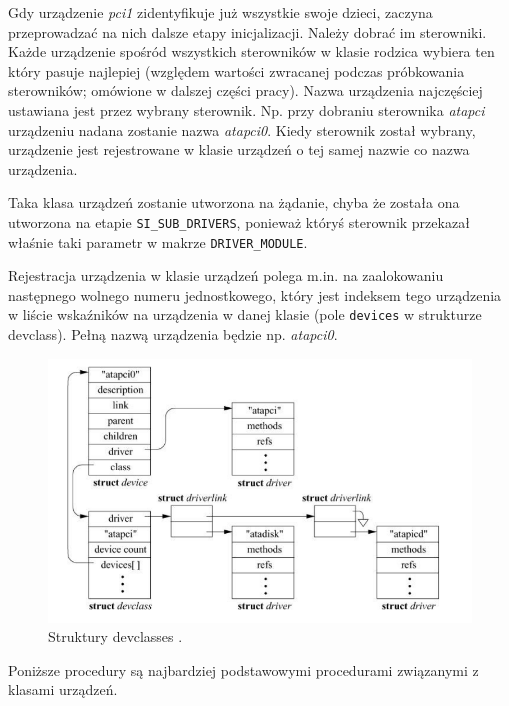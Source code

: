 \documentclass[shortabstract,inz]{iithesis}
\begin{document}
Gdy urządzenie \textit{pci1} zidentyfikuje już wszystkie swoje dzieci, zaczyna przeprowadzać 
na nich dalsze etapy inicjalizacji.
Należy dobrać im sterowniki. Każde urządzenie spośród wszystkich sterowników w
klasie rodzica wybiera ten który pasuje najlepiej (względem wartości zwracanej podczas 
próbkowania sterowników; omówione w dalszej części pracy).
Nazwa urządzenia najczęściej ustawiana jest przez wybrany sterownik.
Np. przy dobraniu sterownika \textit{atapci} urządzeniu nadana zostanie nazwa \textit{atapci0}.
Kiedy sterownik został wybrany, urządzenie jest rejestrowane w klasie urządzeń o tej samej nazwie
co nazwa urządzenia. 

Taka klasa urządzeń zostanie utworzona na żądanie, chyba że została ona utworzona
na etapie \texttt{SI\_SUB\_DRIVERS}, ponieważ któryś sterownik przekazał właśnie taki
parametr w makrze \texttt{DRIVER\_MODULE}.

Rejestracja urządzenia w klasie urządzeń polega m.in. na zaalokowaniu następnego wolnego
numeru jednostkowego, który jest indeksem tego urządzenia w liście wskaźników na urządzenia w danej klasie
(pole \texttt{devices} w strukturze devclass). Pełną nazwą urządzenia będzie np. \textit{atapci0}.

\begin{figure}
  \begin{center}
    \includegraphics[width=\linewidth]{devclass2}
  \caption{Struktury devclasses \cite{image:freebsdbook2}.}
\end{center}
\end{figure}



Poniższe procedury są najbardziej podstawowymi procedurami związanymi z klasami urządzeń. 
\end{document}
